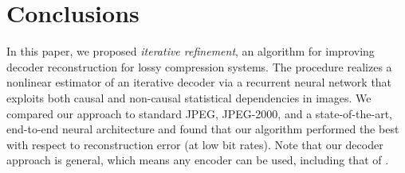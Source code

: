 \documentclass[smallabstract,smallcaptions]{dccpaper}
\begin{document}

\section{Conclusions}
In this paper, we proposed \emph{iterative refinement}, an algorithm for improving decoder reconstruction for lossy compression systems. The procedure realizes a nonlinear estimator of an iterative decoder via a recurrent neural network that exploits both causal and non-causal statistical dependencies in images. We compared our approach to standard JPEG, JPEG-2000, and a state-of-the-art, end-to-end neural architecture and found that our algorithm performed the best with respect to reconstruction error (at low bit rates).
Note that our decoder approach is general, which means any encoder can be used, including that of \cite{toderici2016full}. %




\end{document}
